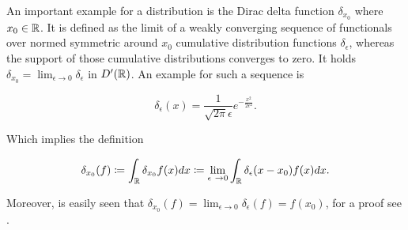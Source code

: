 An important example for a distribution is the Dirac delta function $\delta_{x_{0}}$ where $x_{0} \in \mathbb{R}$. It is defined as the limit of a weakly converging sequence of functionals over normed symmetric around $x_{0}$ cumulative distribution functions $\delta_{\epsilon}$, whereas the support of those cumulative distributions converges to zero. It holds $\delta_{x_{0}} = \lim_{\epsilon \rightarrow 0} \delta_{\epsilon}$ in $D'(\mathbb{R})$. An example for such a sequence is

	\begin{equation}
		\delta_{\epsilon}(x) = \frac{1}{\sqrt{2 \pi} \epsilon} e^{-\frac{x^{2}}{2 \epsilon^{2}}}. \label{smooth-potential}
	\end{equation}
	 
Which implies the definition

	\[ \delta_{x_{0}}(f) \coloneqq \int_{\R} \delta_{x_{0}} f(x) dx \coloneqq \lim_{\epsilon \rightarrow 0} \int_{\R} \delta_{\epsilon}(x - x_{0}) f(x) dx. \]
	
Moreover, is easily seen that $\delta_{x_{0}}(f) = \lim_{\epsilon \rightarrow 0} \delta_{\epsilon}(f) = f(x_{0})$, for a proof see \cite[Chap. 1.4]{WeisST}.

